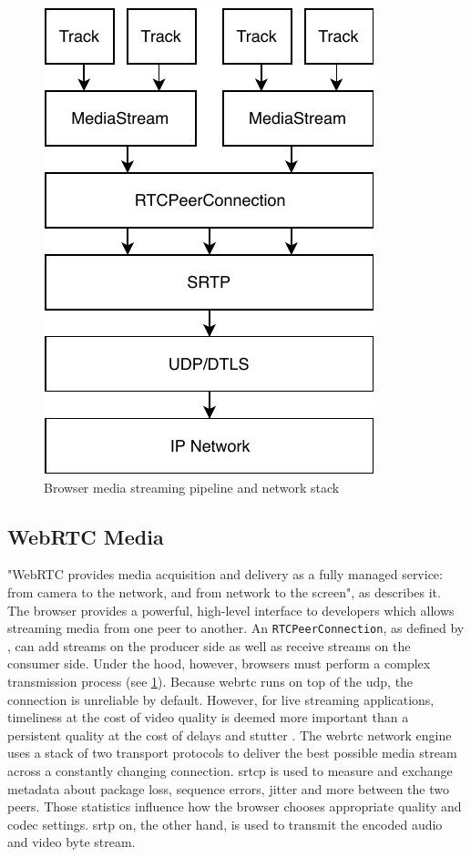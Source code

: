 \begin{figure}
\centering
\includegraphics[width=.5\textwidth]{graphics/media-stream-pipeline.pdf}
\caption{Browser media streaming pipeline and network stack}
\label{fig:pipeline}
\end{figure}

\subsection{WebRTC Media}\label{sec:webrtc-media}

"WebRTC provides media acquisition and delivery as a fully managed service: from camera to the network, and from network to the screen", as \citet[\S18.5]{high-performance-browser-networking} describes it. The browser provides a powerful, high-level interface to developers which allows streaming media from one peer to another. An \lstinline|RTCPeerConnection|, as defined by \citet[\S4.4]{webrtc-w3c}, can add streams on the producer side as well as receive streams on the consumer side. Under the hood, however, browsers must perform a complex transmission process (see \cref{fig:pipeline}). Because \gls{webrtc} runs on top of the \gls{udp}, the connection is unreliable by default. However, for live streaming applications, timeliness at the cost of video quality is deemed more important than a persistent quality at the cost of delays and stutter \cite[\S18.3]{high-performance-browser-networking}. The \gls{webrtc} network engine uses a stack of two transport protocols to deliver the best possible media stream across a constantly changing connection. \Gls{srtcp} is used to measure and exchange metadata about package loss, sequence errors, jitter and more between the two peers. Those statistics influence how the browser chooses appropriate quality and codec settings. \gls{srtp} on, the other hand, is used to transmit the encoded audio and video byte stream.

